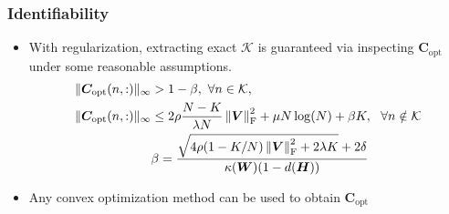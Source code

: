 \documentclass[10pt,xcolor={usenames,dvipsnames,table}]{beamer}
\newcommand{\norm}[1]{\left\lVert#1\right\rVert}
\begin{document}
\begin{frame}[label=fine]
    \frametitle{Identifiability}

    \begin{itemize}
        \item With regularization, extracting exact $\mathcal{K}$ is guaranteed via inspecting $\bm{C}_{\text{opt}}$ under some reasonable assumptions.
\begin{align*} 
    \|\bm{C}_{\text{opt}}(n,:)\|_\infty &> 1- \beta, ~ \forall n \in {\mathcal{K}}, \\
    \|\bm{C}_{\text{opt}}(n,:)\|_\infty &\leq 2\rho\dfrac{N-K}{ \lambda N} \norm{\bm{V}}_{\rm F}^2 + \mu N \log(N) + \beta K ,  ~~\forall n \notin {\cal K}  \\
&\beta = \dfrac{ \sqrt{4\rho (1-K/N) \norm{\bm{V}}_{\rm F}^2 + 2{ \lambda} K} + 2\delta } { \kappa(\bm{W})(1-d(\bm{H}))} 
\end{align*}
        \item Any convex optimization method can be used to obtain $\bm{C}_{\text{opt}}$
    \end{itemize}


\end{frame}
\end{document}

